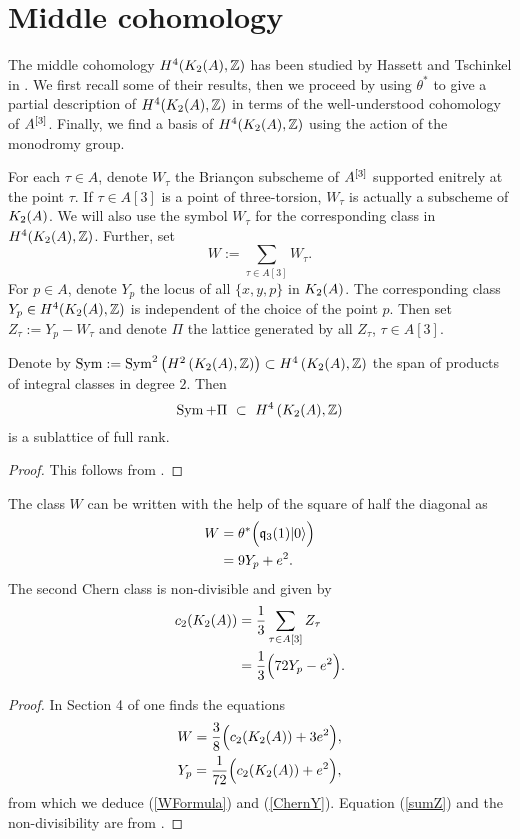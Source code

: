 \section{Middle cohomology}\label{Middle}
The middle cohomology $H^4(K_{ 2 }( A ),\mathbb{Z})$ has been studied by Hassett and Tschinkel in \cite{Hassett}. We first recall some of their results,
then we proceed by using $\theta^*$ to give a partial description of $H^4(K_{ 2 }( A ),\mathbb{Z})$ in terms of the well-understood cohomology of $A^{[3]}$. 
Finally, we find a basis of $H^4(K_{ 2 }( A ),\mathbb{Z})$ using the action of the monodromy group.
\begin{notation}
For each $\tau \in A$, denote $W_\tau$ the Brian\c con subscheme of $A^{[3]}$ supported enitrely at the point $\tau$. If $\tau\in A[3]$ is a point of three-torsion, $W_\tau$ is actually a subscheme of $K_{ 2 }( A )$. We will also use the symbol $W_\tau$ for the corresponding class in $H^4(K_{ 2 }( A ),\mathbb{Z})$. Further, set 
$$
W := \sum_{\tau\in A[3]} W_\tau.
$$
For $p\in A$, denote $Y_p$ the locus of all $\{x,y,p\}$ in $K_{ 2 }( A )$. The corresponding class $Y_p \in H^4(K_{ 2 }( A ),\mathbb{Z})$ is independent of the choice of the point $p$. Then set $Z_\tau := Y_p - W_\tau$ and denote $\Pi$ the lattice generated by all $Z_\tau$, $\tau \in A[3]$.
\end{notation}
\begin{proposition}
Denote by $\operatorname{Sym} := \operatorname{Sym}^2\left(H^2\left(K_{ 2 }( A ),\mathbb{Z}\right)\right) \subset H^4\left(K_{ 2 }( A ),\mathbb{Z}\right) $ the span of products of integral classes in degree $2$.
Then 
$$
\Sym+\Pi \ \subset\  H^4\left(\X,\Z\right)
$$
is a sublattice  of full rank.  
\end{proposition}
\begin{proof}
This follows from \cite[Proposition 4.3]{Hassett}.
\end{proof}

\begin{proposition}
The class $W$ can be written with the help of the square of half the diagonal as
\begin{align} 
W &= \theta^*\Big( \mathfrak{q}_3(1)|0\rangle \Big) \\
\label{WFormula}
&= 9 Y_p + e^2.
\end{align}
The second Chern class is non-divisible and given by 
\begin{align}
\label{sumZ}
c_2(K_{ 2 }( A )) &= \frac{1}{3}\sum_{\tau\in A[3] } Z_\tau \\
\label{ChernY}
&= \frac{1}{3} \Big(72Y_p-e^2 \Big). 
\end{align}
\end{proposition}
\begin{proof} 
In Section 4 of \cite{Hassett} one finds the equations
\begin{gather}
W = \frac{3}{8}\Big(c_2(K_{ 2 }( A )) + 3e^2\Big),\label{WW} \\
Y_p = \frac{1}{72}\Big(c_2(K_{ 2 }( A )) + e^2\Big),
\end{gather}
from which we deduce (\ref{WFormula}) and (\ref{ChernY}).
Equation (\ref{sumZ}) and the non-divisibility are from \cite[Proposition 5.1]{Hassett}.
\end{proof}

